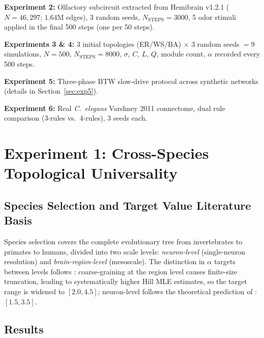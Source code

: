 \documentclass[12pt,a4paper]{article}
\begin{document}
\textbf{Experiment 2:} Olfactory subcircuit extracted from Hemibrain v1.2.1 ($N=46{,}297$; $1.64\text{M}$ edges), 3 random seeds, $N_{\text{STEPS}}=3000$, 5 odor stimuli applied in the final 500 steps (one per 50 steps).

\textbf{Experiments 3 \& 4:} 3 initial topologies (ER/WS/BA) $\times$ 3 random seeds $= 9$ simulations, $N=500$, $N_{\text{STEPS}}=8000$, $\sigma$, $C$, $L$, $Q$, module count, $\alpha$ recorded every 500 steps.

\textbf{Experiment 5:} Three-phase BTW slow-drive protocol across synthetic networks (details in Section~\ref{sec:exp5}).

\textbf{Experiment 6:} Real \textit{C.\ elegans} Varshney 2011 connectome, dual rule comparison (3-rules vs.\ 4-rules), 3 seeds each.

\section{Experiment 1: Cross-Species Topological Universality}

\subsection{Species Selection and Target Value Literature Basis}

Species selection covers the complete evolutionary tree from invertebrates to primates to humans, divided into two scale levels: \emph{neuron-level} (single-neuron resolution) and \emph{brain-region-level} (mesoscale). The distinction in $\alpha$ targets between levels follows \citet{haimovici2013}: coarse-graining at the region level causes finite-size truncation, leading to systematically higher Hill MLE estimates, so the target range is widened to $[2.0, 4.5]$; neuron-level follows the theoretical prediction of \citet{beggs2003}: $[1.5, 3.5]$.

\subsection{Results}
\end{document}

